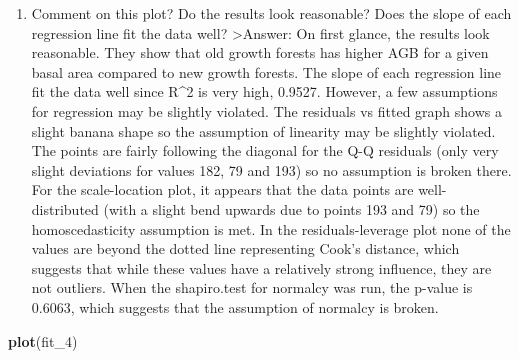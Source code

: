 \documentclass[
]{article}
\newenvironment{Shaded}{\begin{snugshade}}{\end{snugshade}}
\newcommand{\FunctionTok}[1]{\textcolor[rgb]{0.13,0.29,0.53}{\textbf{#1}}}
\newcommand{\NormalTok}[1]{#1}
\providecommand{\tightlist}{%
  \setlength{\itemsep}{0pt}\setlength{\parskip}{0pt}}
\begin{document}
\begin{enumerate}
\def\labelenumi{\alph{enumi}.}
\setcounter{enumi}{4}
\tightlist
\item
  Comment on this plot? Do the results look reasonable? Does the slope
  of each regression line fit the data well? \textgreater Answer: On
  first glance, the results look reasonable. They show that old growth
  forests has higher AGB for a given basal area compared to new growth
  forests. The slope of each regression line fit the data well since
  R\^{}2 is very high, 0.9527. However, a few assumptions for regression
  may be slightly violated. The residuals vs fitted graph shows a slight
  banana shape so the assumption of linearity may be slightly violated.
  The points are fairly following the diagonal for the Q-Q residuals
  (only very slight deviations for values 182, 79 and 193) so no
  assumption is broken there. For the scale-location plot, it appears
  that the data points are well-distributed (with a slight bend upwards
  due to points 193 and 79) so the homoscedasticity assumption is met.
  In the residuals-leverage plot none of the values are beyond the
  dotted line representing Cook's distance, which suggests that while
  these values have a relatively strong influence, they are not
  outliers. When the shapiro.test for normalcy was run, the p-value is
  0.6063, which suggests that the assumption of normalcy is broken.
\end{enumerate}

\begin{Shaded}
\begin{Highlighting}[]
\FunctionTok{plot}\NormalTok{(fit\_4)}
\end{Highlighting}
\end{Shaded}
\end{document}
